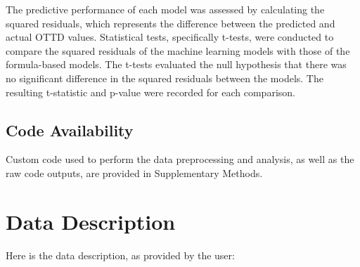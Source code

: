\documentclass[11pt]{article}
\begin{document}
The predictive performance of each model was assessed by calculating the squared residuals, which represents the difference between the predicted and actual OTTD values. Statistical tests, specifically t-tests, were conducted to compare the squared residuals of the machine learning models with those of the formula-based models. The t-tests evaluated the null hypothesis that there was no significant difference in the squared residuals between the models. The resulting t-statistic and p-value were recorded for each comparison.\subsection*{Code Availability}

Custom code used to perform the data preprocessing and analysis, as well as the raw code outputs, are provided in Supplementary Methods.


\clearpage
\appendix

\section{Data Description} \label{sec:data_description} Here is the data description, as provided by the user:
\end{document}
